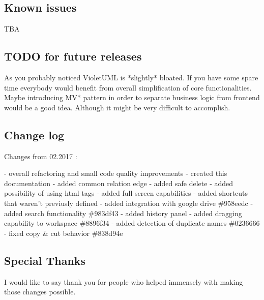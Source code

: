 \documentclass{article}
\begin{document}
\subsection{Known issues}

TBA

\subsection{TODO for future releases}
As you probably noticed VioletUML is *slightly* bloated. If you have some spare time
everybody would benefit from overall simplification of core functionalities.
Maybe introducing MV* pattern in order to separate business logic from frontend would be a good idea.
Although it might be very difficult to accomplish.

\subsection{Change log}

Changes from 02.2017 :

- overall refactoring and small code quality improvements \newline
- created this documentation\newline
- added common relation edge\newline
- added safe delete\newline
- added possibility of using html tags\newline
- added full screen capabilities\newline
- added shortcuts that waren't previusly defined\newline
- added integration with google drive                        \#958eedc\newline
- added search functionality                                 \#983df43\newline
- added history panel\newline
- added dragging capability to workspace                     \#8896f34\newline
- added detection of duplicate names                         \#0236666\newline
- fixed copy \& cut behavior                                  \#838d94e\newline


\subsection{Special Thanks}
I would like to say thank you for people who helped immensely with making those changes possible.
\end{document}
